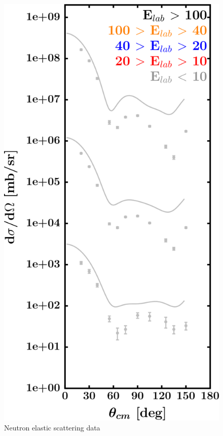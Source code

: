 \begin{figure}[H]
\begin{minipage}{0.45\textwidth}
        \includegraphics[width=1.0\textwidth]{figures/ni64_neutronElastic.png}
        \caption{Neutron elastic scattering data}
        \label{DOMFitData_ni64_neutron_elastic}
    \end{minipage}
\end{figure}

